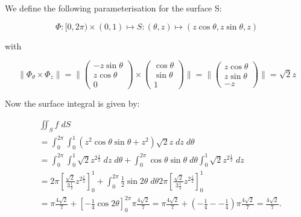 \documentclass[11pt]{article}
\begin{document}
\begin{solution}
  We define the following parameterisation for the surface S:

$$
\Phi: [0,2\pi) \times (0,1) \mapsto S: (\theta,z)\mapsto (z\cos\theta, z\sin\theta,z)
$$

with

$$
\|\Phi_{\theta}\times \Phi_{z}\|  = \|\begin{pmatrix} -z\sin\theta \\ z\cos\theta\\0 \end{pmatrix} \times \begin{pmatrix} \cos\theta \\ \sin\theta \\1 \end{pmatrix}\| = \|\begin{pmatrix} z\cos\theta \\ z\sin\theta \\ -z \end{pmatrix}\| = \sqrt{2}z
$$

Now the surface integral is given by:

\begin{align*}
        &
	\iint_{S} f \;d S
        \\&
        = \int_0^{2\pi} \int_0^1 \left(z^2\cos\theta \sin\theta + z^2 \right)\sqrt{2}z\;d z \;d \theta
        \\&
        = \int_0^{2\pi} \int_0^1\sqrt{2}z^{2\frac{1}{2}} \;d z \;d \theta + \int_0^{2\pi} \cos\theta \sin\theta \;d \theta \int_0^1  \sqrt{2}z^{2\frac{1}{2}}\;d z 
        \\&
        =2\pi \left[\frac{\sqrt{2}}{3\frac{1}{2}} z^{2\frac{1}{2}}\right]_0^{1} + \int_0^{2\pi} \frac{1}{2}\sin2\theta \;d \theta 2\pi \left[\frac{\sqrt{2}}{3\frac{1}{2}} z^{2\frac{1}{2}}\right]_0^{1}
        \\&
        =\pi \frac{4\sqrt{2}}{7}+ \left[-\frac{1}{4}\cos2\theta\right]_{0}^{2\pi} \pi \frac{4\sqrt{2}}{7} = \pi \frac{4\sqrt{2}}{7}+ \left(-\frac{1}{4} -  - \frac{1}{4}\right) \pi \frac{4\sqrt{2}}{7} = \frac{4\sqrt{2}}{7} 
        .
    \end{align*}

\end{solution}
\end{document}
